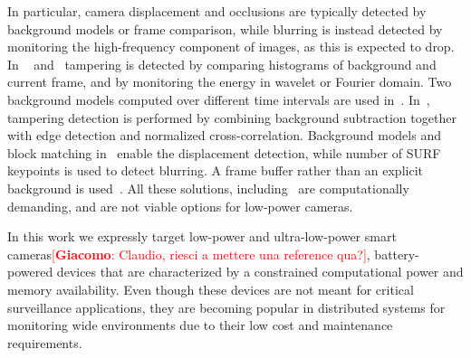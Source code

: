\documentclass{llncs}
\newcommand{\gi}[1]{{\textcolor{red}{[\small \textbf{Giacomo}: #1]}}}
\begin{document}
In particular, camera displacement and occlusions are typically detected by background models or frame comparison, while blurring is instead detected by monitoring the high-frequency component of images, as this is expected to drop. In ~\cite{aksay2007camera} and~\cite{saglam2009real} tampering is detected by comparing histograms of background and current frame, and by monitoring the energy in wavelet or Fourier domain. Two background models computed over different time intervals are used in~\cite{saglam2009real}. In~\cite{gil2007automatic}, tampering detection is performed by combining background subtraction together with edge detection and normalized cross-correlation. Background models and block matching in~\cite{tsesmelis2013tamper} enable the displacement detection, while number of SURF~\cite{SURF} keypoints is used to detect blurring. A frame buffer rather than an explicit background is used~\cite{ribnick2006real}. All these solutions, including~\cite{ribnick2006real,harasse2004automated,kryjak2012fpga} are computationally demanding, and are not viable options for low-power cameras. 

In this work we expressly target low-power and ultra-low-power smart cameras\gi{Claudio, riesci a mettere una reference qua?}, battery-powered devices that are characterized by a constrained computational power and memory availability. Even though these devices are not meant for critical surveillance applications, they are becoming popular in distributed systems for monitoring wide environments due to their low cost and maintenance requirements.  %
\end{document}
